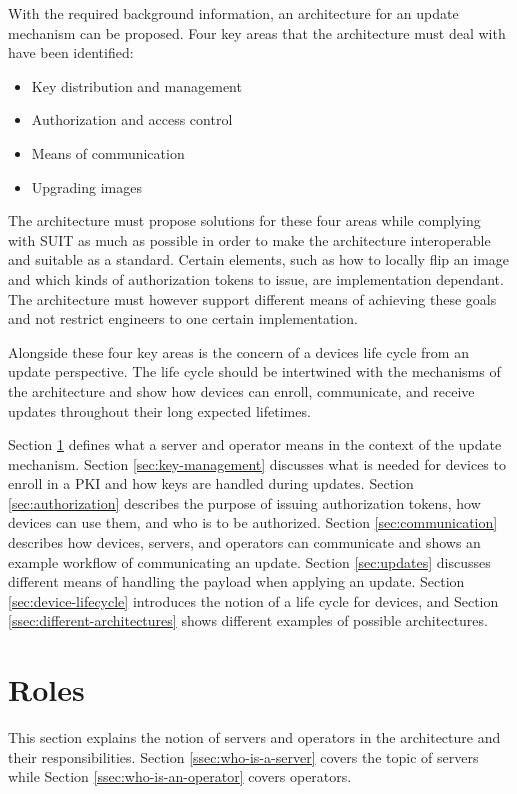 \documentclass[0-thesis.tex]{subfiles}
\begin{document}
With the required background information, an architecture for an update mechanism can be
proposed. Four key areas that the architecture must deal with have been identified:

\begin{itemize}
    \item Key distribution and management
    \item Authorization and access control
    \item Means of communication
    \item Upgrading images
\end{itemize}

The architecture must propose solutions for these four areas while complying with SUIT as
much as possible in order to make the architecture interoperable and suitable as a
standard. Certain elements, such as how to locally flip an image and which kinds of
authorization tokens to issue, are implementation dependant. The architecture must however
support different means of achieving these goals and not restrict engineers to one certain
implementation.

Alongside these four key areas is the concern of a devices life cycle from an update
perspective. The life cycle should be intertwined with the mechanisms of the architecture
and show how devices can enroll, communicate, and receive updates throughout their long
expected lifetimes. 

Section \ref{sec:roles} defines what a server and operator means in the context of the
update mechanism. Section \ref{sec:key-management} discusses what is needed for devices to
enroll in a PKI and how keys are handled during updates. Section \ref{sec:authorization}
describes the purpose of issuing authorization tokens, how devices can use them, and who
is to be authorized. Section \ref{sec:communication} describes how devices, servers, and
operators can communicate and shows an example workflow of communicating an update.
Section \ref{sec:updates} discusses different means of handling the payload when applying
an update. Section \ref{sec:device-lifecycle} introduces the notion of a life cycle for
devices, and Section \ref{ssec:different-architectures} shows different examples of
possible architectures.

\section{Roles}
\label{sec:roles}
This section explains the notion of servers and operators in the architecture and their
responsibilities. Section \ref{ssec:who-is-a-server} covers the topic of servers while
Section \ref{ssec:who-is-an-operator} covers operators.
\end{document}
